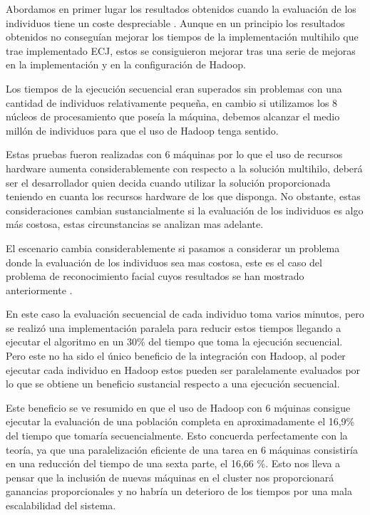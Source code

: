Abordamos en primer lugar los resultados obtenidos cuando la evaluaci\'on de los individuos tiene un coste despreciable . Aunque en un principio los resultados obtenidos no consegu\'ian mejorar los tiempos de la implementaci\'on multihilo que trae implementado ECJ, estos se consiguieron mejorar tras una serie de mejoras en la implementaci\'on y en la configuraci\'on de Hadoop.

Los tiempos de la ejecuci\'on secuencial eran superados sin problemas con una cantidad de individuos relativamente peque\~na, en cambio si utilizamos los 8 núcleos de procesamiento que poseía la m\'aquina, debemos alcanzar el medio mill\'on de individuos para que el uso de Hadoop tenga sentido. 

Estas pruebas fueron realizadas con 6 m\'aquinas por lo que el uso de recursos hardware aumenta considerablemente con respecto a la soluci\'on multihilo, deber\'a ser el desarrollador quien decida cuando utilizar la soluci\'on proporcionada teniendo en cuanta los recursos hardware de los que disponga. No obstante, estas consideraciones cambian sustancialmente si la evaluaci\'on de los individuos es algo m\'as costosa, estas circunstancias se analizan mas adelante.


El escenario cambia considerablemente si pasamos a considerar un problema donde la evaluaci\'on de los individuos sea mas costosa, este es el caso del problema de reconocimiento facial cuyos resultados se han mostrado anteriormente . 

En este caso la evaluaci\'on secuencial de cada individuo toma varios minutos, pero se realiz\'o una implementaci\'on paralela para reducir estos tiempos llegando a ejecutar el algoritmo en un 30\% del tiempo que toma la ejecuci\'on secuencial. Pero este no ha sido el \'unico beneficio de la integraci\'on con Hadoop, al poder ejecutar cada individuo en Hadoop estos pueden ser paralelamente evaluados por lo que se obtiene un beneficio sustancial respecto a una ejecuci\'on secuencial. 

Este beneficio se ve resumido en que el uso de Hadoop con 6 m\'quinas consigue ejecutar la evaluación de una población completa en aproximadamente el 16,9\% del tiempo que tomar\'ia secuencialmente. Esto concuerda perfectamente con la teoría, ya que una paralelizaci\'on eficiente de una tarea en 6 m\'aquinas consistiría en una reducción del tiempo de una sexta parte, el 
16,66 \%. Esto nos lleva a pensar que la inclusi\'on de nuevas m\'aquinas en el cluster nos proporcionar\'a ganancias proporcionales y no habr\'ia un deterioro de los tiempos por una mala escalabilidad del sistema.


